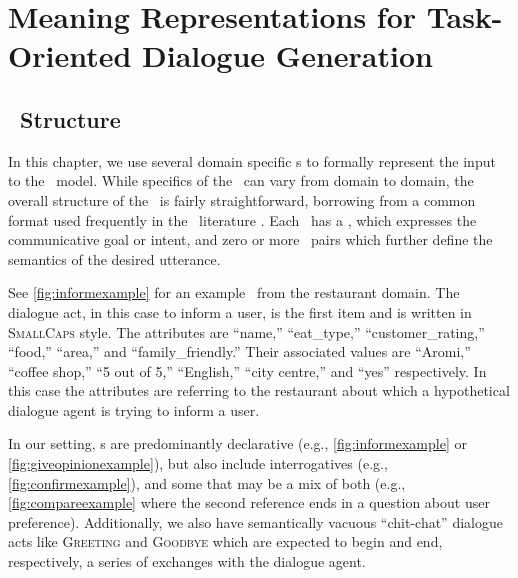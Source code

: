 \section{Meaning Representations for Task-Oriented Dialogue Generation}
\label{sec:mr4tod}

\subsection{\MeaningRepresentation~Structure}

In this chapter, we use several domain specific \meaningrepresentation s to
formally represent the input to the \surfacerealization~model.  While specifics
of the \meaningrepresentation~can vary from domain to domain, the overall
structure of the \meaningrepresentation~is fairly straightforward, borrowing
from a common format used frequently in  the
\naturallanguagegeneration~literature
\citep{mairesse2010,gasic2014,wen2015,novikova2017,juraska2019}. Each
\meaningrepresentation~has a \dialogueact, which expresses the communicative
goal or intent, and zero or more \attributevalue~pairs which further define the
semantics of the desired utterance. 

See \autoref{fig:informexample} for an example \meaningrepresentation~from the
restaurant domain. The dialogue act, in this case to inform a user, is the
first item and is written in \textsc{SmallCaps} style.  The attributes are
``name,'' ``eat\_type,'' ``customer\_rating,'' ``food,'' ``area,'' and
``family\_friendly.'' Their associated values are ``Aromi,'' ``coffee shop,''
``5 out of 5,'' ``English,'' ``city centre,'' and ``yes'' respectively. In this
case the attributes are referring to the restaurant about which a hypothetical
dialogue agent is trying to inform a user.

In our setting, \dialogueact s are predominantly declarative (e.g.,
\autoref{fig:informexample} or \autoref{fig:giveopinionexample}), but also
include interrogatives  (e.g., \autoref{fig:confirmexample}), and some that may
be a mix of both (e.g., \autoref{fig:compareexample} where the second reference
ends in a question about user preference).  Additionally, we also have
semantically vacuous ``chit-chat'' dialogue acts like \textsc{Greeting} and
\textsc{Goodbye} which are expected to begin and end, respectively, a series of
exchanges with the dialogue agent. 



